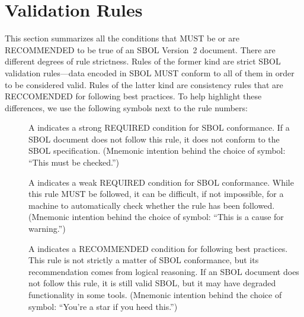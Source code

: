 \newcommand{\printValid}{\validRule{sbol-\arabic{sbolCtr}\addtocounter{sbolCtr}{1}}}
\newcommand{\printWarning}{\consistencyRule{sbol-\arabic{sbolCtr}\addtocounter{sbolCtr}{1}}}
\newcommand{\printModeling}{\modelingRule{sbol-\arabic{sbolCtr}\addtocounter{sbolCtr}{1}}}

\section{Validation Rules}
\label{validation}

This section summarizes all the conditions that MUST be or 
are RECOMMENDED to be true of an SBOL Version~2 document.  
There are different degrees of rule strictness.  
Rules of the former kind are strict SBOL validation rules---data encoded in SBOL MUST conform to
all of them in order to be considered valid.  Rules of the latter kind
are consistency rules that are RECCOMENDED for following best practices.  To help highlight these differences, we use the
following symbols next to the rule numbers:

\begin{description}

\item[\hspace*{6.5pt}\vSymbol\vsp] A \vSymbolName indicates a strong
  REQUIRED condition for SBOL conformance. If a SBOL document does not follow this rule, it does not conform to the SBOL
  specification.  (Mnemonic intention behind the choice of symbol:
  ``This must be checked.'')

\item[\hspace*{6.5pt}\cSymbol\csp] A \cSymbolName indicates a weak
  REQUIRED condition for SBOL conformance. While this rule MUST be followed, it can be difficult, if not  impossible, for a machine to automatically check whether the rule has been followed. (Mnemonic intention behind the choice of symbol: ``This is a cause for warning.'')

\item[\hspace*{6.5pt}\mSymbol\msp] A \mSymbolName indicates a 
  RECOMMENDED condition for following best practices.  This rule is not strictly a matter of SBOL conformance, but its recommendation comes from logical
  reasoning.  If an SBOL document does not follow this rule, it is still valid SBOL, but it may have degraded functionality in some tools.  (Mnemonic intention behind the choice of symbol: ``You're a star if you heed this.'')

\end{description}

